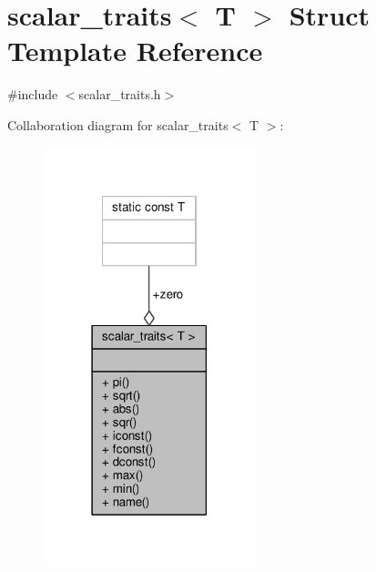 \hypertarget{structscalar__traits}{\section{scalar\-\_\-traits$<$ T $>$ Struct Template Reference}
\label{structscalar__traits}
}


{\ttfamily \#include $<$scalar\-\_\-traits.\-h$>$}



Collaboration diagram for scalar\-\_\-traits$<$ T $>$\-:\nopagebreak
\begin{figure}[H]
\begin{center}
\leavevmode
\includegraphics[width=174pt]{structscalar__traits__coll__graph}
\end{center}
\end{figure}
